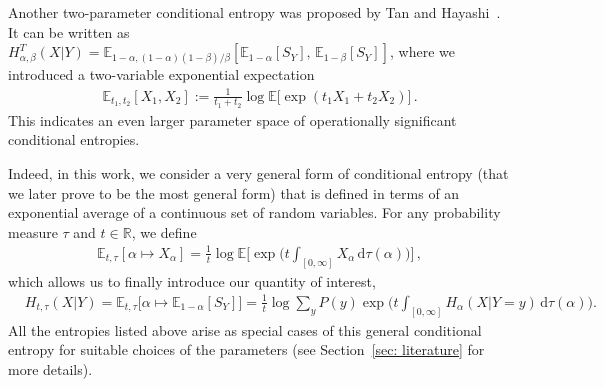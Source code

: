 \documentclass[aps,pra,11pt,onecolumn,nofootinbib,tightenlines]{revtex4-2}
\theoremstyle{definition}
\def \d {\mathrm{d}}
\newcommand{\mb}[1]{\mathbb{#1}}
\begin{document}
Another two-parameter conditional entropy was proposed by Tan and Hayashi~\cite%
{tan2018conditional}. It can be written as 
$H_{\alpha,\beta}^T(X|Y) =  \mb{E}_{1-\alpha, (1-\alpha) (1-\beta)/\beta}[\mb{E}_{1-\alpha}[S_{Y}],\, \mb{E}_{1-\beta}[S_{Y}]]$, where we introduced a two-variable exponential expectation
\begin{align}
    \mb{E}_{t_1,t_2}[X_1, X_2] := \frac{1}{t_1+t_2} \log \mb{E}\big[ \exp( t_1 X_1 + t_2 X_2) \big] \,.
\end{align}
This indicates an even larger parameter space of operationally significant conditional entropies. 


Indeed, in this work, we consider a very general form of conditional entropy (that we later prove to be the most general form) that is defined in terms of an exponential average of a continuous set of random variables. For any probability measure $\tau$ and $t \in \mathbb{R}$, we define
\begin{align}
    \mb{E}_{t, \tau}[ \alpha \mapsto X_\alpha] = \frac{1}{t} \log \mb{E}\Bigg[ \exp \Bigg( t \int_{[0,\infty]} X_\alpha\, \d \tau(\alpha) \Bigg) \Bigg] \, ,
\end{align}
which allows us to finally introduce our quantity of interest,
\begin{align}
 & H_{t, \tau}(X|Y) = \mb{E}_{t, \tau} \big[ \alpha \mapsto \mb{E}_{1-\alpha}[S_Y] \big] =\frac{1}{t} \log \sum_{y} P(y)\exp \bigg(t \int_{[0,\infty]}H_\alpha(X|Y\!=\!y)\, \d\tau(\alpha)\bigg).\label{eq:General}
\end{align}
All the entropies listed above arise as special cases of this general conditional entropy for suitable choices of the parameters (see Section~\ref{sec: literature} for more details). %
\end{document}
